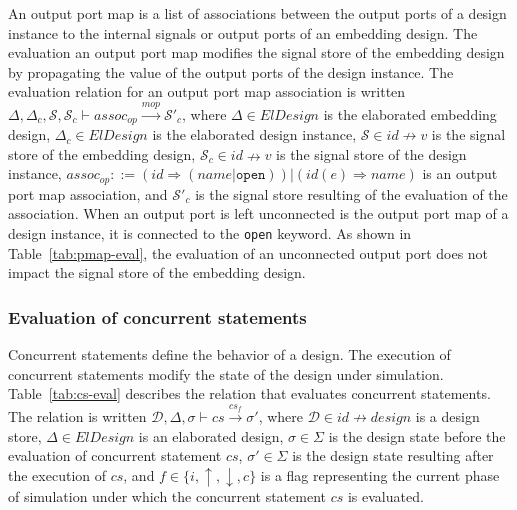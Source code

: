 An output port map is a list of associations between the output ports
of a design instance to the internal signals or output ports of an
embedding design.  The evaluation an output port map modifies the
signal store of the embedding design by propagating the value of the
output ports of the design instance. The evaluation relation for an
output port map association is written
$\Delta,\Delta_c,\mathcal{S},\mathcal{S}_c\vdash{}assoc_{op}\xrightarrow{mop}\mathcal{S}'_c$,
where $\Delta\in{}ElDesign$ is the elaborated embedding design,
$\Delta_c\in{}ElDesign$ is the elaborated design instance,
$\mathcal{S}\in{}id\nrightarrow{}v$ is the signal store of the
embedding design, $\mathcal{S}_c\in{}id\nrightarrow{}v$ is the signal
store of the design instance,
$assoc_{op}::=(id\Rightarrow{}(name|\mathtt{open}))\big|(id(e)\Rightarrow{}name)$
is an output port map association, and $\mathcal{S}'_c$ is the signal
store resulting of the evaluation of the association. When an output
port is left unconnected is the output port map of a design instance,
it is connected to the \texttt{open} keyword. As shown in
Table~\ref{tab:pmap-eval}, the evaluation of an unconnected output
port does not impact the signal store of the embedding design. 

\subsubsection{Evaluation of concurrent statements}
\label{subsubsec:cs-eval}

Concurrent statements define the behavior of a \hvhdl{} design. The
execution of concurrent statements modify the state of the \hvhdl{}
design under simulation. Table~\ref{tab:cs-eval} describes the
relation that evaluates concurrent statements. The relation is written
$\mathcal{D},\Delta,\sigma\vdash{}cs\xrightarrow{cs_f}\sigma'$, where
$\mathcal{D}\in{}id\nrightarrow{}design$ is a design store,
$\Delta\in{}ElDesign$ is an elaborated design, $\sigma\in\Sigma$ is
the design state before the evaluation of concurrent statement $cs$,
$\sigma'\in\Sigma$ is the design state resulting after the execution
of $cs$, and $f\in\{i,\uparrow,\downarrow,c\}$ is a flag representing
the current phase of simulation under which the concurrent statement
$cs$ is evaluated.


